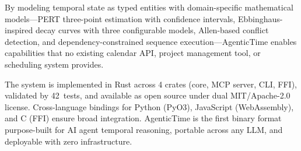 \documentclass[10pt, twocolumn]{article}
\begin{document}
By modeling temporal state as typed entities with domain-specific mathematical models---PERT three-point estimation with confidence intervals, Ebbinghaus-inspired decay curves with three configurable models, Allen-based conflict detection, and dependency-constrained sequence execution---AgenticTime enables capabilities that no existing calendar API, project management tool, or scheduling system provides.

The system is implemented in Rust across 4 crates (core, MCP server, CLI, FFI), validated by 42~tests, and available as open source under dual MIT/Apache-2.0 license. Cross-language bindings for Python (PyO3), JavaScript (WebAssembly), and C (FFI) ensure broad integration. AgenticTime is the first binary format purpose-built for AI agent temporal reasoning, portable across any LLM, and deployable with zero infrastructure.




\end{document}
